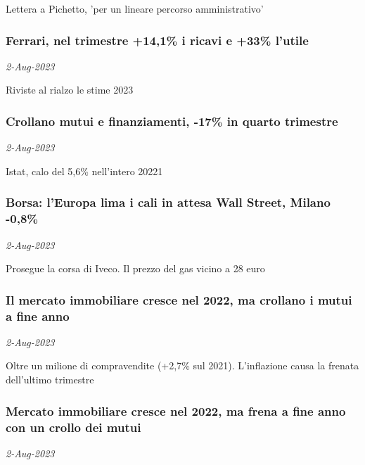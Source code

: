 Lettera a Pichetto, 'per un lineare percorso amministrativo'
\subsubsection{Ferrari, nel trimestre +14,1\% i ricavi e +33\% l'utile \href{https://www.ansa.it/sito/notizie/economia/2023/08/02/ferrari-nel-trimestre-141-i-ricavi-e-33-lutile_4eedca70-b5c0-49a1-bbfb-3dfe13b0051a.html}{}}
\textit{2-Aug-2023}

Riviste al rialzo le stime 2023
\subsubsection{Crollano mutui e finanziamenti, -17\% in quarto trimestre \href{https://www.ansa.it/sito/notizie/economia/2023/08/02/crollano-mutui-e-finanziamenti-17-in-quarto-trimestre_e675c591-6671-4bd4-9689-10d60400faa8.html}{}}
\textit{2-Aug-2023}

Istat, calo del 5,6\% nell'intero 20221
\subsubsection{Borsa: l'Europa lima i cali in attesa Wall Street, Milano -0,8\% \href{https://www.ansa.it/sito/notizie/economia/2023/08/02/borsa-leuropa-lima-i-cali-in-attesa-wall-street-milano-08_e68f1c9b-6f30-45f3-b58d-8fd9b5f4117e.html}{}}
\textit{2-Aug-2023}

Prosegue la corsa di Iveco. Il prezzo del gas vicino a 28 euro
\subsubsection{Il mercato immobiliare cresce nel 2022, ma crollano i mutui a fine anno \href{https://www.ansa.it/sito/notizie/economia/2023/08/02/il-mercato-immobiliare-cresce-nel-2022-ma-crollano-i-mutui-a-fine-anno_8100ba7f-f3e6-4569-969c-0109575b6dac.html}{}}
\textit{2-Aug-2023}

Oltre un milione di compravendite (+2,7\% sul 2021). L'inflazione causa la frenata dell'ultimo trimestre
\subsubsection{Mercato immobiliare cresce nel 2022, ma frena a fine anno con un crollo dei mutui \href{https://www.ansa.it/sito/notizie/economia/2023/08/02/mercato-immobiliare-cresce-nel-2022-ma-frena-a-fine-anno_2286e286-ae71-42c3-8e78-88ca4e37de89.html}{}}
\textit{2-Aug-2023}

